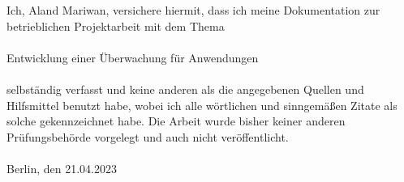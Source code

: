 \newpage
{\color{blue}}

\label{Eidesstattliche Erklärung}

Ich, Aland Mariwan, versichere hiermit, dass ich meine Dokumentation zur betrieblichen Projektarbeit
mit dem Thema
\\
\\
Entwicklung einer Überwachung für Anwendungen
\\
\\
selbständig verfasst und keine anderen als die angegebenen Quellen und Hilfsmittel benutzt
habe, wobei ich alle wörtlichen und sinngemäßen Zitate als solche gekennzeichnet habe. Die
Arbeit wurde bisher keiner anderen Prüfungsbehörde vorgelegt und auch nicht veröffentlicht.
\\
\\
Berlin, den 21.04.2023
